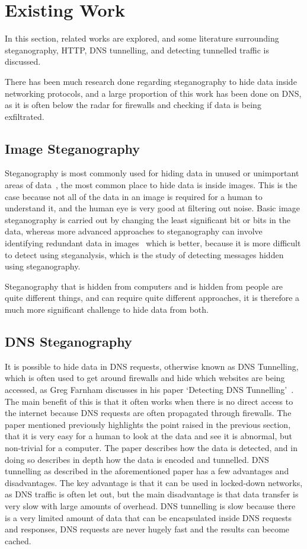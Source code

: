 \section{Existing Work}
In this section, related works are explored, and some literature surrounding steganography, HTTP, DNS tunnelling, and detecting tunnelled traffic is discussed.

There has been much research done regarding steganography to hide data inside networking protocols, and a large proportion of this work has been done on DNS, as it is often below the radar for firewalls and checking if data is being exfiltrated.
\subsection{Image Steganography}
Steganography is most commonly used for hiding data in unused or unimportant areas of data~\cite{exploringsteno}, the most common place to hide data is inside images. This is the case because not all of the data in an image is required for a human to understand it, and the human eye is very good at filtering out noise.
Basic image steganography is carried out by changing the least significant bit or bits in the data, whereas more advanced approaches to steganography can involve identifying redundant data in images~\cite{introsteno} which is better, because it is more difficult to detect using steganalysis, which is the study of detecting messages hidden using steganography.

Steganography that is hidden from computers and is hidden from people are quite different things, and can require quite different approaches, it is therefore a much more significant challenge to hide data from both.

\subsection{DNS Steganography}
It is possible to hide data in DNS requests, otherwise known as DNS Tunnelling, which is often used to get around firewalls and hide which websites are being accessed, as Greg Farnham discusses in his paper `Detecting DNS Tunnelling'~\cite{detectingdns}. The main benefit of this is that it often works when there is no direct access to the internet because DNS requests are often propagated through firewalls.
The paper mentioned previously highlights the point raised in the previous section, that it is very easy for a human to look at the data and see it is abnormal, but non-trivial for a computer.
The paper describes how the data is detected, and in doing so describes in depth how the data is encoded and tunnelled.
DNS tunnelling as described in the aforementioned paper has a few advantages and disadvantages.
The key advantage is that it can be used in locked-down networks, as DNS traffic is often let out, but the main disadvantage is that data transfer is very slow with large amounts of overhead.
DNS tunnelling is slow because there is a very limited amount of data that can be encapsulated inside DNS requests and responses, DNS requests are never hugely fast and the results can become cached.
